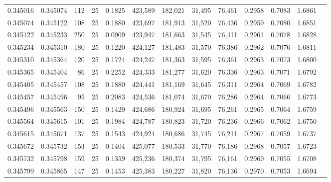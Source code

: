 \begin{tabular}{rrrrrrrrrrrrr}
0.345016 & 0.345074 &   112 &  25 &                                     0.1825 & 423,589 & 182,021 &  31,495 &  76,461 & 0.2958 & 0.7083 & 1.6861 \\
0.345074 & 0.345122 &   108 &  25 &                                     0.1880 & 423,697 & 181,913 &  31,520 &  76,436 & 0.2959 & 0.7080 & 1.6851 \\
0.345122 & 0.345233 &   250 &  25 &                                     0.0909 & 423,947 & 181,663 &  31,545 &  76,411 & 0.2961 & 0.7078 & 1.6828 \\
0.345234 & 0.345310 &   180 &  25 &                                     0.1220 & 424,127 & 181,483 &  31,570 &  76,386 & 0.2962 & 0.7076 & 1.6811 \\
0.345310 & 0.345364 &   120 &  25 &                                     0.1724 & 424,247 & 181,363 &  31,595 &  76,361 & 0.2963 & 0.7073 & 1.6800 \\
0.345365 & 0.345404 &    86 &  25 &                                     0.2252 & 424,333 & 181,277 &  31,620 &  76,336 & 0.2963 & 0.7071 & 1.6792 \\
0.345405 & 0.345457 &   108 &  25 &                                     0.1880 & 424,441 & 181,169 &  31,645 &  76,311 & 0.2964 & 0.7069 & 1.6782 \\
0.345457 & 0.345496 &    95 &  25 &                                     0.2083 & 424,536 & 181,074 &  31,670 &  76,286 & 0.2964 & 0.7066 & 1.6773 \\
0.345496 & 0.345563 &   150 &  25 &                                     0.1429 & 424,686 & 180,924 &  31,695 &  76,261 & 0.2965 & 0.7064 & 1.6759 \\
0.345564 & 0.345615 &   101 &  25 &                                     0.1984 & 424,787 & 180,823 &  31,720 &  76,236 & 0.2966 & 0.7062 & 1.6750 \\
0.345615 & 0.345671 &   137 &  25 &                                     0.1543 & 424,924 & 180,686 &  31,745 &  76,211 & 0.2967 & 0.7059 & 1.6737 \\
0.345672 & 0.345732 &   153 &  25 &                                     0.1404 & 425,077 & 180,533 &  31,770 &  76,186 & 0.2968 & 0.7057 & 1.6723 \\
0.345732 & 0.345798 &   159 &  25 &                                     0.1359 & 425,236 & 180,374 &  31,795 &  76,161 & 0.2969 & 0.7055 & 1.6708 \\
0.345799 & 0.345865 &   147 &  25 &                                     0.1453 & 425,383 & 180,227 &  31,820 &  76,136 & 0.2970 & 0.7053 & 1.6694 \\

\end{tabular}
